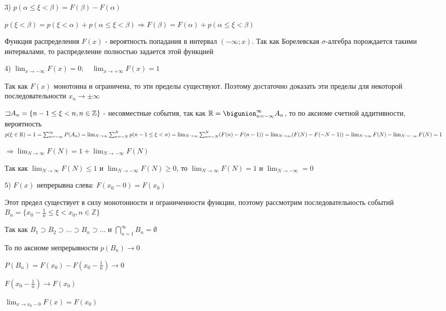\documentclass[12pt]{article}
\begin{document}
    3) $p(\alpha \leq \xi < \beta) = F(\beta) - F(\alpha)$

    \begin{MyProof}
        $p(\xi < \beta) = p(\xi < \alpha) + p(\alpha \leq \xi < \beta) \Longrightarrow F(\beta) = F(\alpha) + p(\alpha \leq \xi < \beta)$
    \end{MyProof}
    
    \Notas Функция распределения $F(x)$ - вероятность попадания в интервал $(-\infty; x)$. Так как Борелевская $\sigma$-алгебра порождается такими интервалами,
    то распределение полностью задается этой функцией

    4) $\lim_{x \to -\infty} F(x) = 0; \quad \lim_{x \to +\infty} F(x) = 1$

    \begin{MyProof}
        Так как $F(x)$ монотонна и ограничена, то эти пределы существуют. Поэтому достаточно доказать эти пределы для некоторой последовательности $x_n \to \pm \infty$

        $\mathord{\sqsupset} A_n = \{n - 1 \leq \xi < n, n \in \mathbb{Z}\}$ - несовместные события, так как $\Real = \bigunion_{n = -\infty}^\infty A_n$, то
        по аксиоме счетной аддитивности, вероятность $p(\xi \in \mathbb{R}) = 1 = \sum_{n = -\infty}^\infty P(A_n) = \lim_{N \to \infty} \sum_{n = -N}^N p(n - 1 \leq \xi < n) = 
        \lim_{N \to \infty} \sum_{n = -N}^N (F(n) - F(n - 1)) = \lim_{N \to \infty} (F(N) - F(-N - 1)) = \lim_{N \to \infty} F(N) - \lim_{N \to -\infty} F(N) = 1$

        $\Longrightarrow \lim_{N \to \infty} F(N) = 1 + \lim_{N \to -\infty} F(N) $

        Так как $\lim_{N \to \infty} F(N) \leq 1$ и $\lim_{N \to -\infty} F(N) \geq 0$, то $\lim_{N \to \infty} F(N) = 1$ и $\lim_{N \to -\infty} = 0$
    \end{MyProof}
    
    5) $F(x)$ непрерывна слева: $F(x_0 - 0) = F(x_0)$

    \begin{MyProof}
        Этот предел существует в силу монотонности и ограниченности функции, поэтому рассмотрим последовательность событий $B_n = \{x_0 - \frac{1}{n} \leq \xi < x_0, n \in \mathbb{Z}\}$

        Так как $B_1 \supset B_2 \supset \dots \supset B_n \supset \dots$ и $\bigcap_{n = 1}^\infty B_n = \emptyset$

        То по аксиоме непрерывности $p(B_n) \to 0$

        $P(B_n) = F(x_0) - F(x_0 - \frac{1}{n}) \rightarrow 0$

        $F(x_0 - \frac{1}{n}) \to F(x_0)$

        $\lim_{x \to x_0 - 0} F(x) = F(x_0)$
    \end{MyProof}
    
\end{document}
